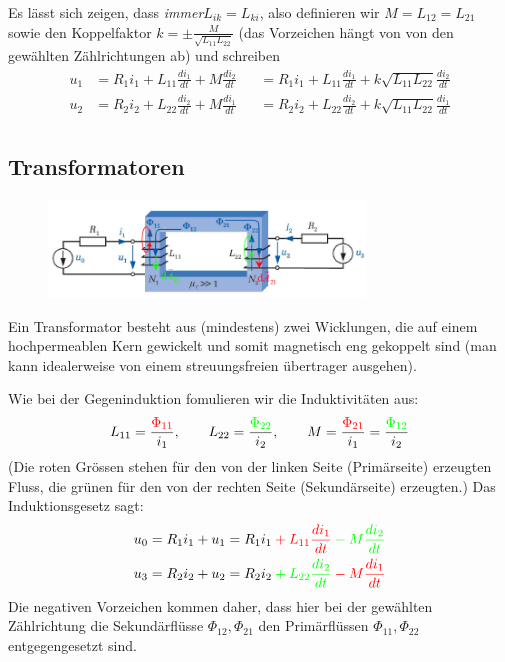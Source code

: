 Es lässt sich zeigen, dass \textit{immer}$L_{ik} = L_{ki}$, also definieren wir $M=L_{12}=L_{21}$ sowie den Koppelfaktor
$k =  \pm\frac{M}{\sqrt{L_{11}L_{22}}}$ (das Vorzeichen hängt von von den gewählten Zählrichtungen ab) und schreiben
\begin{equation*}
\begin{alignedat}{2}
u_1 &= R_1i_1 + L_{11}\frac{di_1}{dt}+M\frac{di_2}{dt} &&= R_1i_1 + L_{11}\frac{di_1}{dt}+k\sqrt{L_{11}L_{22}}\frac{di_2}{dt} \\
u_2 &= R_2i_2 + L_{22}\frac{di_2}{dt}+M\frac{di_1}{dt} &&= R_2i_2 + L_{22}\frac{di_2}{dt}+k\sqrt{L_{11}L_{22}}\frac{di_1}{dt}\\
\end{alignedat}
\end{equation*}
\pagebreak

\subsection{Transformatoren}
\begin{figure}[H]
\center
\vspace{-0.5cm}
\includegraphics[width=0.75\textwidth]{img/Tra2}
\vspace{-0.2cm}
\end{figure}
Ein Transformator besteht aus (mindestens) zwei Wicklungen, die auf einem hochpermeablen Kern gewickelt und somit magnetisch eng gekoppelt sind (man kann idealerweise von einem streuungsfreien übertrager ausgehen). \newline

Wie bei der Gegeninduktion fomulieren wir die Induktivitäten aus:
$$ L_{11} = \frac{\color{red}\Phi_{11}}{i_1}, \qquad L_{22}= \frac{\color{green}\Phi_{22}}{i_2}, \qquad
M = \frac{\color{red}\Phi_{21}}{i_1}=\frac{\color{green}\Phi_{12}}{i_2}$$
(Die roten Grössen stehen für den von der linken Seite (Primärseite) erzeugten Fluss, die grünen für den von der rechten Seite (Sekundärseite) erzeugten.) Das Induktionsgesetz sagt:
 \begin{equation*}
\begin{alignedat}{2}
u_0 &= R_1i_1 + u_1 &&= R_1i_1 \color{red} + L_{11}\frac{di_1}{dt} \color{green} - M\frac{di_2}{dt} \\
u_3 &= R_2i_2 + u_2 &&= R_2i_2 \color{green} + L_{22}\frac{di_2}{dt} \color{red}-M\frac{di_1}{dt}\\
\end{alignedat}
\end{equation*}
Die negativen Vorzeichen kommen daher, dass hier bei der gewählten Zählrichtung die Sekundärflüsse $\Phi_{12},\Phi_{21}$ den Primärflüssen $\Phi_{11},\Phi_{22}$ entgegengesetzt sind. \newline


